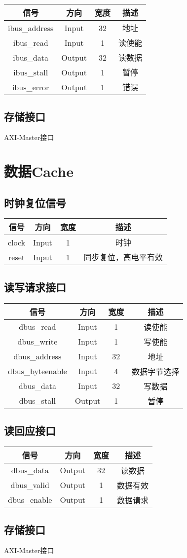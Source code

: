 \documentclass{article}
\newenvironment{signals}{
	\begin{center}
		\begin{tabular}{| c | c | c | c |}
			\hline
			信号 & 方向 & 宽度 & 描述 \\ \hline
}{
		\end{tabular}
	\end{center}
}
\newcommand\sigin{Input}
\newcommand\sigout{Output}
\begin{document}
\begin{signals}
	ibus\_address & \sigin & 32 & 地址 \\ \hline
	ibus\_read & \sigin & 1 & 读使能 \\ \hline
	ibus\_data & \sigout & 32 & 读数据 \\ \hline
	ibus\_stall & \sigout & 1 & 暂停 \\ \hline
	ibus\_error & \sigout & 1 & 错误 \\ \hline
\end{signals}

\subsection{存储接口}

AXI-Master接口

\section{数据Cache}

\subsection{时钟复位信号}

\begin{signals}
	clock & \sigin & 1 & 时钟 \\ \hline
	reset & \sigin & 1 & 同步复位，高电平有效 \\ \hline
\end{signals}

\subsection{读写请求接口}

\begin{signals}
	dbus\_read & \sigin & 1 & 读使能 \\ \hline
	dbus\_write & \sigin & 1 & 写使能 \\ \hline
	dbus\_address & \sigin & 32 & 地址 \\ \hline
	dbus\_byteenable & \sigin & 4 & 数据字节选择 \\ \hline
	dbus\_data & \sigin & 32 & 写数据 \\ \hline
	dbus\_stall & \sigout & 1 & 暂停 \\ \hline
\end{signals}

\subsection{读回应接口}

\begin{signals}
	dbus\_data & \sigout & 32 & 读数据 \\ \hline
	dbus\_valid & \sigout & 1 & 数据有效 \\ \hline
	dbus\_enable & \sigout & 1 & 数据请求 \\ \hline
\end{signals}

\subsection{存储接口}

AXI-Master接口
\end{document}
